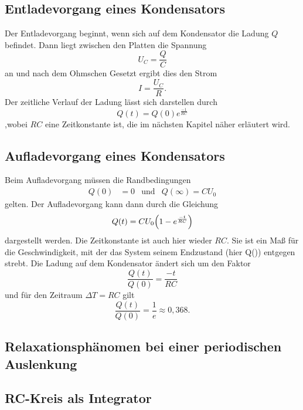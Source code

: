 \subsection{Entladevorgang eines Kondensators} %
\label{sub:Entladevorgang}
Der Entladevorgang beginnt, wenn sich auf dem Kondensator die Ladung $Q$ befindet.
Dann liegt zwischen den Platten die Spannung
\begin{equation}
    U_C = \frac{Q}{C}
\end{equation}
an und nach dem Ohmschen Gesetzt ergibt dies den Strom
\begin{equation}
    I = \frac{U_C}{R} .
\end{equation}
Der zeitliche Verlauf der Ladung lässt sich darstellen durch
\begin{equation}
    Q(t) = Q(0) e^{\frac{-1}{RC}}
\end{equation}
,wobei $RC$ eine Zeitkonstante ist, die im nächsten Kapitel näher erläutert wird.


\subsection{Aufladevorgang eines Kondensators} %
\label{sub:Aufladevorgang}
Beim Aufladevorgang müssen die Randbedingungen
\begin{align}
    Q(0)&=0 &\text{und}& Q(\infty)=CU_0
\end{align}
gelten. Der Aufladevorgang kann dann durch die Gleichung
\begin{equation}
    Q(t)= CU_0\Bigl(1-e^{\frac{-t}{RC}}\Bigr)
\end{equation}
dargestellt werden. Die Zeitkonstante ist auch hier wieder $RC$.
Sie ist ein Maß für die Geschwindigkeit, mit der das System seinem Endzustand (hier Q(\infty)) entgegen strebt.
Die Ladung auf dem Kondensator ändert sich um den Faktor
\begin{equation}
    \frac{Q(t)}{Q(0)} = \frac{-t}{RC}
\end{equation}
und für den Zeitraum $\Delta T = RC$ gilt
\begin{equation}
    \frac{Q(t)}{Q(0)} = \frac{1}{e} \approx 0,368 .
\end{equation}



\subsection{Relaxationsphänomen bei einer periodischen Auslenkung} %
\label{sub:Rela_peri}


\subsection{RC-Kreis als Integrator} %
\label{sub:Integrator4}


